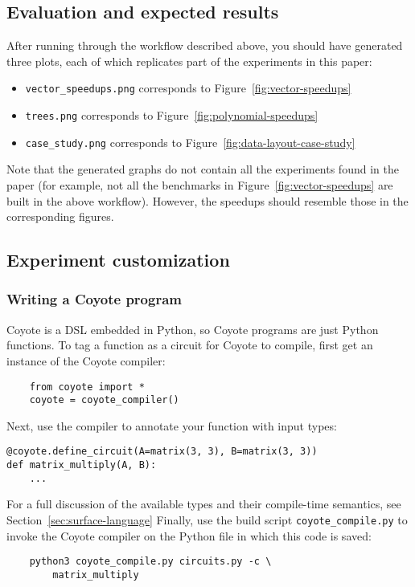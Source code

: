\subsection{Evaluation and expected results}

After running through the workflow described above, you should have generated three plots, each of which replicates part of the experiments in this paper:
\begin{itemize}
    \item {\tt vector\_speedups.png} corresponds to Figure~\ref{fig:vector-speedups}
    \item {\tt trees.png} corresponds to Figure~\ref{fig:polynomial-speedups}
    \item {\tt case\_study.png} corresponds to Figure~\ref{fig:data-layout-case-study}
\end{itemize}
Note that the generated graphs do not contain all the experiments found in the paper (for example, not all the benchmarks in Figure~\ref{fig:vector-speedups} are built in the above workflow).
However, the speedups should resemble those in the corresponding figures.

\subsection{Experiment customization}
\subsubsection{Writing a Coyote program}
Coyote is a DSL embedded in Python, so Coyote programs are just Python functions. To tag a function as a circuit for Coyote to compile, first get an instance of the Coyote compiler:
\begin{verbatim}
    from coyote import *
    coyote = coyote_compiler()
\end{verbatim}
Next, use the compiler to annotate your function with input types:
\begin{verbatim}
@coyote.define_circuit(A=matrix(3, 3), B=matrix(3, 3))
def matrix_multiply(A, B):
    ...
\end{verbatim}
For a full discussion of the available types and their compile-time semantics, see Section~\ref{sec:surface-language}
Finally, use the build script {\tt coyote\_compile.py} to invoke the Coyote compiler on the Python file in which this code is saved:
\begin{verbatim}
    python3 coyote_compile.py circuits.py -c \
        matrix_multiply
\end{verbatim}
